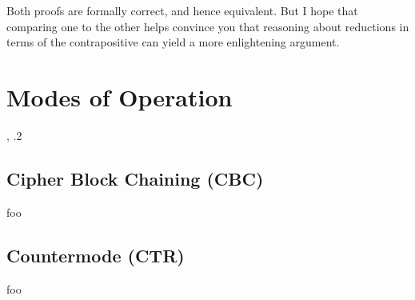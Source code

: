   \vspace{1em}

  \noindent Both proofs are formally correct, and hence equivalent. But I hope that comparing one to the other helps convince you that reasoning about reductions in terms of the contrapositive can  yield a more enlightening argument.

\section{Modes of Operation}
  \label{sec:modes_of_operations}
  \cite{KatzLindell:IMC}, .2

  \subsection{Cipher Block Chaining (CBC)}
  \label{sec:cbc_mode}
  foo

  \subsection{Countermode (CTR)}
  \label{sec:ctr_mode}
  foo

